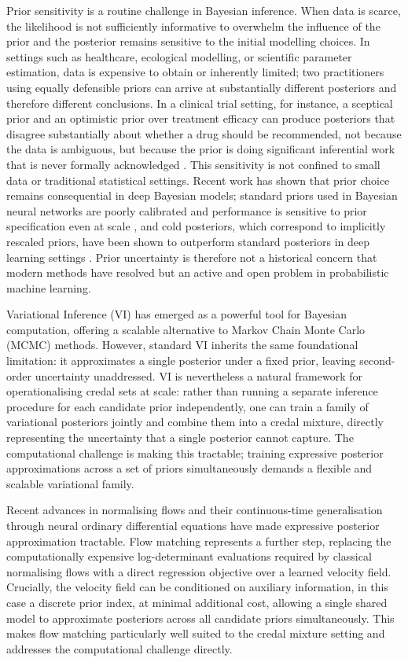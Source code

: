 Prior sensitivity is a routine challenge in Bayesian inference. When data 
is scarce, the likelihood is not sufficiently informative to overwhelm the 
influence of the prior and the posterior remains sensitive to the initial 
modelling choices. In settings such as healthcare, ecological modelling, or 
scientific parameter estimation, data is expensive to obtain or inherently 
limited; two practitioners using equally defensible priors can arrive at 
substantially different posteriors and therefore different conclusions. In a 
clinical trial setting, for instance, a sceptical prior and an optimistic 
prior over treatment efficacy can produce posteriors that disagree 
substantially about whether a drug should be recommended, not because the 
data is ambiguous, but because the prior is doing significant inferential 
work that is never formally acknowledged \citep{berger1994}. This sensitivity 
is not confined to small data or traditional statistical settings. Recent 
work has shown that prior choice remains consequential in deep Bayesian 
models; standard priors used in Bayesian neural networks are poorly 
calibrated and performance is sensitive to prior specification even at 
scale \citep{fortuin2021}, and cold posteriors, which correspond to 
implicitly rescaled priors, have been shown to outperform standard 
posteriors in deep learning settings \citep{wenzel2020}. Prior 
uncertainty is therefore not a historical concern that modern methods 
have resolved but an active and open problem in probabilistic machine 
learning.

Variational Inference (VI) has emerged as a powerful tool for Bayesian 
computation, offering a scalable alternative to Markov Chain Monte Carlo 
(MCMC) methods. However, standard VI inherits the same foundational 
limitation: it approximates a single posterior under a fixed prior, leaving 
second-order uncertainty unaddressed. VI is nevertheless a natural framework 
for operationalising credal sets at scale: rather than running a separate 
inference procedure for each candidate prior independently, one can train a 
family of variational posteriors jointly and combine them into a credal 
mixture, directly representing the uncertainty that a single posterior cannot 
capture. The computational challenge is making this tractable; training 
expressive posterior approximations across a set of priors simultaneously 
demands a flexible and scalable variational family.

Recent advances in normalising flows and their continuous-time generalisation 
through neural ordinary differential equations \citep{chen2018} have made 
expressive posterior approximation tractable. Flow matching \citep{lipman2022} represents a further step, replacing the computationally expensive 
log-determinant evaluations required by classical normalising flows with a 
direct regression objective over a learned velocity field. Crucially, the 
velocity field can be conditioned on auxiliary information, in this case a 
discrete prior index, at minimal additional cost, allowing a single shared 
model to approximate posteriors across all candidate priors simultaneously. 
This makes flow matching particularly well suited to the credal mixture 
setting and addresses the computational challenge directly.

